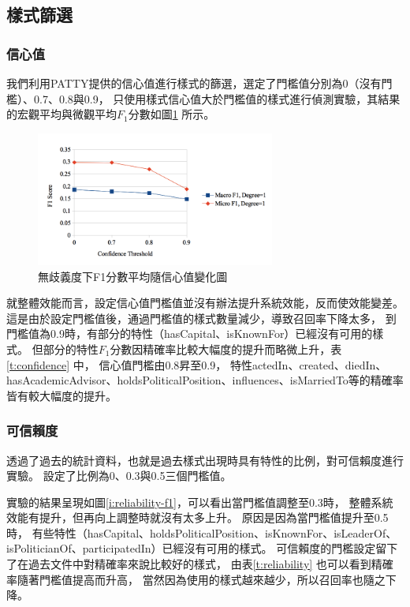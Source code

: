 

\subsection{樣式篩選}
\subsubsection{信心值}
我們利用PATTY提供的信心值進行樣式的篩選，選定了門檻值分別為0（沒有門檻）、0.7、0.8與0.9，
只使用樣式信心值大於門檻值的樣式進行偵測實驗，其結果的宏觀平均與微觀平均$F_1$分數如圖\ref{i:conf-f1} 所示。

\begin{figure}
    \centering
    \includegraphics[width=0.7\textwidth]{images/04-conf-f1}
    \caption{無歧義度下F1分數平均隨信心值變化圖}
    \label{i:conf-f1}
\end{figure}

就整體效能而言，設定信心值門檻值並沒有辦法提升系統效能，反而使效能變差。
這是由於設定門檻值後，通過門檻值的樣式數量減少，導致召回率下降太多，
到門檻值為0.9時，有部分的特性（hasCapital、isKnownFor）已經沒有可用的樣式。
但部分的特性$F_1$分數因精確率比較大幅度的提升而略微上升，表\ref{t:confidence} 中，
信心值門檻由0.8昇至0.9，
特性actedIn、created、diedIn、hasAcademicAdvisor、holdsPoliticalPosition、influences、isMarriedTo等的精確率皆有較大幅度的提升。



\subsubsection{可信賴度}
透過了過去的統計資料，也就是過去樣式出現時具有特性的比例，對可信賴度進行實驗。
設定了比例為0、0.3與0.5三個門檻值。

實驗的結果呈現如圖\ref{i:reliability-f1}，可以看出當門檻值調整至0.3時，
整體系統效能有提升，但再向上調整時就沒有太多上升。
原因是因為當門檻值提升至0.5時，
有些特性（hasCapital、holdsPoliticalPosition、isKnownFor、isLeaderOf、isPoliticianOf、participatedIn）已經沒有可用的樣式。
可信賴度的門檻設定留下了在過去文件中對精確率來說比較好的樣式，
由表\ref{t:reliability} 也可以看到精確率隨著門檻值提高而升高，
當然因為使用的樣式越來越少，所以召回率也隨之下降。

